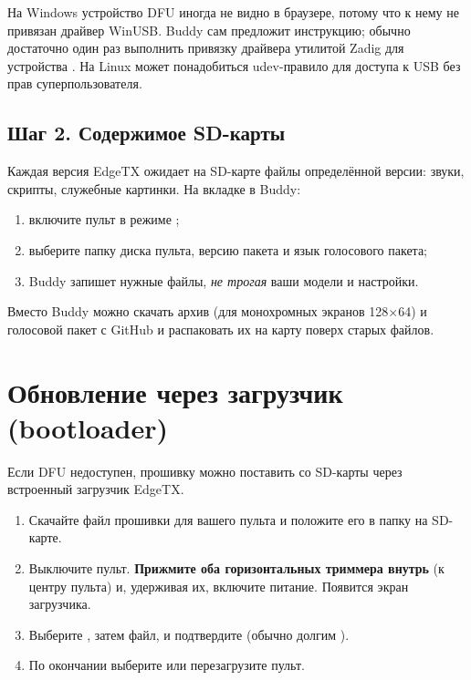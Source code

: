 \begin{tip}
На Windows устройство DFU иногда не видно в браузере, потому что к нему не привязан драйвер
WinUSB. Buddy сам предложит инструкцию; обычно достаточно один раз выполнить привязку
драйвера утилитой Zadig для устройства . На Linux может понадобиться
udev-правило для доступа к USB без прав суперпользователя.
\end{tip}

\subsection{Шаг 2. Содержимое SD-карты}

Каждая версия EdgeTX ожидает на SD-карте файлы определённой версии: звуки, скрипты,
служебные картинки. На вкладке  в Buddy:
\begin{enumerate}
  \item включите пульт в режиме ;
  \item выберите папку диска пульта, версию пакета и язык голосового пакета;
  \item Buddy запишет нужные файлы, \emph{не трогая} ваши модели и настройки.
\end{enumerate}

Вместо Buddy можно скачать архив  (для монохромных экранов
128×64) и голосовой пакет с GitHub и распаковать их на карту поверх старых файлов.

\section{Обновление через загрузчик (bootloader)}

Если DFU недоступен, прошивку можно поставить со SD-карты через встроенный загрузчик EdgeTX.

\begin{enumerate}
  \item Скачайте файл прошивки  для вашего пульта и положите его в папку
         на SD-карте.
  \item Выключите пульт. \textbf{Прижмите оба горизонтальных триммера внутрь}
        (к центру пульта) и, удерживая их, включите питание. Появится экран загрузчика.
  \item Выберите , затем файл, и подтвердите (обычно долгим ).
  \item По окончании выберите  или перезагрузите пульт.
\end{enumerate}

